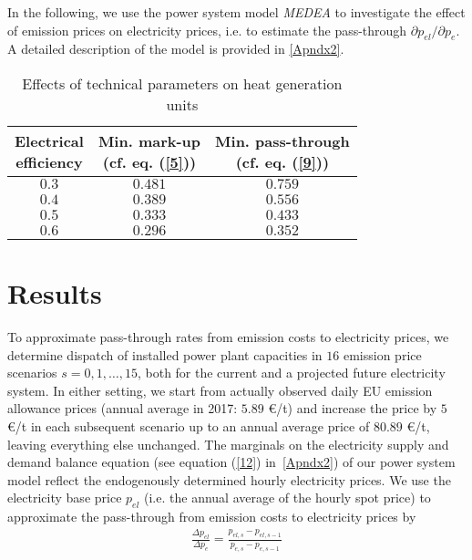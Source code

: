 \documentclass[preprint, 12pt, authoryear]{elsarticle}
\begin{document}
In the following, we use the power system model \emph{MEDEA} to investigate the effect of emission prices on electricity prices, i.e. to estimate the pass-through $\partial p_{el} / \partial p_{e}$. A detailed description of the model is provided in \ref{Apndx2}.

\begin{table}[t]
\caption{Effects of technical parameters on heat generation units}
\smallskip
\centering
\begin{tabular}{c c c}
\hline
\makecell{Electrical \\efficiency} & \makecell{Min. mark-up \\(cf. eq. (\ref{5}))} &
\makecell{Min. pass-through \\ (cf. eq. (\ref{9}))} \\ [1.5 ex]
\hline  \hline
$0.3$ & $0.481$ & $0.759$ \\ [0.5 ex] \hline
$0.4$ & $0.389$ & $0.556$ \\ [0.5 ex] \hline
$0.5$ & $0.333$ & $0.433$ \\ [0.5 ex] \hline
$0.6$ & $0.296$ & $0.352$ \\ [1.0 ex]
\hline \hline
\end{tabular}
\label{Tab1}
\end{table}

\section{Results} \label{sec_results}
To approximate pass-through rates from  emission costs to electricity prices, we determine dispatch of installed power plant capacities in $16$ emission price scenarios $s = 0,1,\ldots,15$, both for the current and a projected future electricity system.
In either setting, we start from actually observed daily EU emission allowance prices (annual average in 2017: $5.89$ \euro{}/t) and increase the price by $5$ \euro{}/t in each subsequent scenario up to an annual average price of $80.89$ \euro{}/t, leaving everything else unchanged.
The marginals on the electricity supply and demand balance equation (see equation (\ref{12}) in~\ref{Apndx2}) of our power system model reflect the endogenously determined hourly electricity prices.
We use the electricity base price $p_{el}$ (i.e. the annual average of the hourly spot price) to approximate the pass-through from emission costs to electricity prices by
\begin{align}\label{10}
\frac{\Delta p_{el}}{\Delta p_{e}} = \frac{p_{el, s} - p_{el, s-1}}{p_{e, s} - p_{e, s-1}}
\end{align} 
\end{document}
